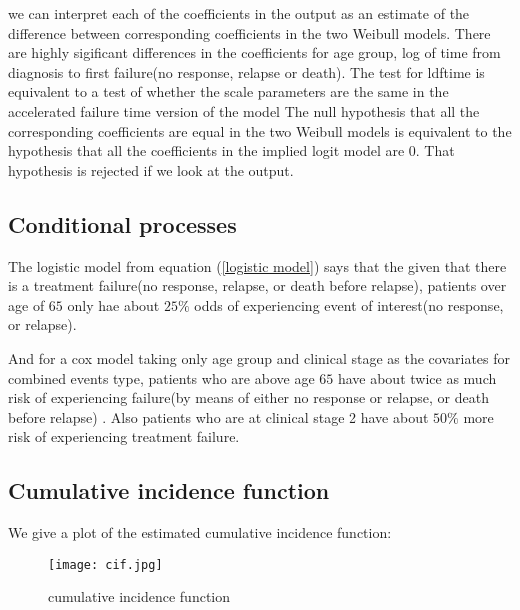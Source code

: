 \documentclass[times, doublespace]{simauth}
\begin{document}
we can interpret each of the coefficients in the output as an estimate of the difference between corresponding
coefficients in the two Weibull models. There are highly sigificant differences in the coefficients for age group, 
log of time from diagnosis to first failure(no response, relapse or death). The test for ldftime is equivalent to
a test of whether the scale parameters are the same in the accelerated failure time version of the model
The null hypothesis that all the corresponding coefficients are equal in the two Weibull models is equivalent to the hypothesis that all the 
coefficients in the implied logit model are 0. That hypothesis is rejected if we look at the output.

\subsection{Conditional processes}
The logistic model from equation (\ref{logistic model}) says that the given that there is a treatment failure(no response, relapse, or death before relapse), patients over age of $65$ only hae about $25\%$ odds of experiencing event of interest(no response, or relapse). 

And for a cox model taking only age group and clinical stage as the covariates for combined events type, patients who are above age $65$ have about twice as much risk of experiencing failure(by means of either no response or relapse, or death before relapse) . Also  patients who are at clinical stage 2 have about $50\%$ more risk of experiencing treatment failure.

\subsection{Cumulative incidence function}
We give a plot of the estimated cumulative incidence function:

 \begin{figure}[!htb]
\begin{center}
\caption{cumulative incidence function}
\texttt{[image: cif.jpg]}\label{cif}
\end{center}
\end{figure}
\end{document}

